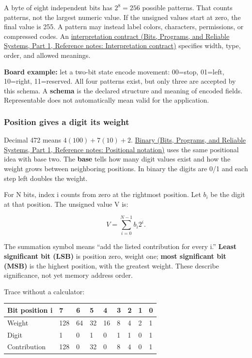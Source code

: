 A byte of eight independent bits has \(2^8=256\) possible patterns. That counts patterns, not the largest numeric value. If the unsigned values start at zero, the final value is 255. A pattern may instead label colors, characters, permissions, or compressed codes. An \href{../01-Bits-Programs-and-Reliable-Systems-P01/main.pdf\#nameddest=appendix-f414bd4ed05c}{interpretation contract (Bits, Programs, and Reliable Systems, Part 1, Reference notes: Interpretation contract)} specifies width, type, order, and allowed meanings.

\textbf{Board example:} let a two-bit state encode movement: 00=stop, 01=left, 10=right, 11=reserved. All four patterns exist, but only three are accepted by this schema. A \textbf{schema} is the declared structure and meaning of encoded fields. Representable does not automatically mean valid for the application.

\subsubsection{Position gives a digit its weight}\label{05-engine-i-ch001-position-gives-a-digit-its-weight}

\hypertarget{05-engine-i-ch001-position-gives-a-digit-its-weight}{}

Decimal 472 means \(4(100)+7(10)+2\). \href{../01-Bits-Programs-and-Reliable-Systems-P01/main.pdf\#nameddest=appendix-83c3f28f7bda}{Binary (Bits, Programs, and Reliable Systems, Part 1, Reference notes: Positional notation)} uses the same positional idea with base two. The \textbf{base} tells how many digit values exist and how the weight grows between neighboring positions. In binary the digits are 0/1 and each step left doubles the weight.

For N bits, index i counts from zero at the rightmost position. Let \(b_i\) be the digit at that position. The unsigned value V is:

\[
V=\sum_{i=0}^{N-1}b_i2^i.
\]

The summation symbol means ``add the listed contribution for every i.'' \textbf{Least significant bit (LSB)} is position zero, weight one; \textbf{most significant bit (MSB)} is the highest position, with the greatest weight. These describe significance, not yet memory address order.

Trace  without a calculator:

{\def\LTcaptype{none} %
\begin{longtable}[]{@{}lllllllll@{}}
\toprule\noalign{}
Bit position i & 7 & 6 & 5 & 4 & 3 & 2 & 1 & 0 \\
\midrule\noalign{}
\endhead
\bottomrule\noalign{}
\endlastfoot
Weight & 128 & 64 & 32 & 16 & 8 & 4 & 2 & 1 \\
Digit & 1 & 0 & 1 & 0 & 1 & 1 & 0 & 1 \\
Contribution & 128 & 0 & 32 & 0 & 8 & 4 & 0 & 1 \\
\end{longtable}
}


